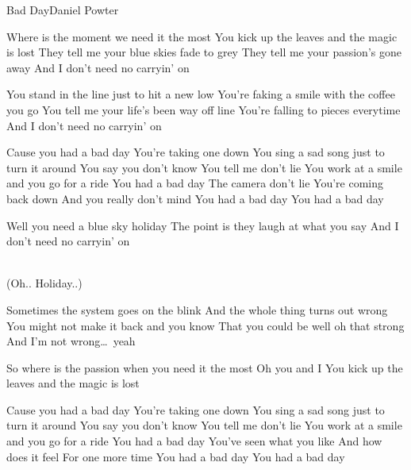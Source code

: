 \documentclass[a4paper,11pt,french]{article}
\begin{document}
\begin{Song}{Bad Day}{Daniel Powter}
\begin{multicols}{2}

\begin{Verse}
Where is the moment we need it the most 
You kick up the leaves and the magic is lost 
They tell me your blue skies fade to grey 
They tell me your passion's gone away 
And I don't need no carryin' on 
\end{Verse}
\espaceInterStrophe

\begin{Verse}
You stand in the line just to hit a new low 
You're faking a smile with the coffee you go 
You tell me your life's been way off line 
You're falling to pieces everytime 
And I don't need no carryin' on 
\end{Verse}
\espaceInterStrophe

\begin{Chorus}
Cause you had a bad day 
You're taking one down 
You sing a sad song just to turn it around 
You say you don't know 
You tell me don't lie 
You work at a smile and you go for a ride
You had a bad day 
The camera don't lie 
You're coming back down 
And you really don't mind 
You had a bad day 
You had a bad day 
\end{Chorus}
\espaceInterStrophe

\begin{Verse}
Well you need a blue sky holiday 
The point is they laugh at what you say 
And I don't need no carryin' on 
\end{Verse}
\columnbreak

\\
(Oh.. Holiday..) 
\espaceInterStrophe

\begin{Bridge}
Sometimes the system goes on the blink 
And the whole thing turns out wrong 
You might not make it back and you know 
That you could be well oh that strong 
And I'm not wrong\dots\ yeah
\end{Bridge}
\espaceInterStrophe

\begin{Verse}
So where is the passion when you need it the most 
Oh you and I 
You kick up the leaves and the magic is lost 
\end{Verse}
\espaceInterStrophe

\begin{Chorus}
Cause you had a bad day 
You're taking one down 
You sing a sad song just to turn it around 
You say you don't know 
You tell me don't lie 
You work at a smile and you go for a ride 
You had a bad day 
You've seen what you like 
And how does it feel 
For one more time 
You had a bad day 
You had a bad day
\end{Chorus}
\vfill
~


\end{multicols}
\end{Song}
\end{document}
